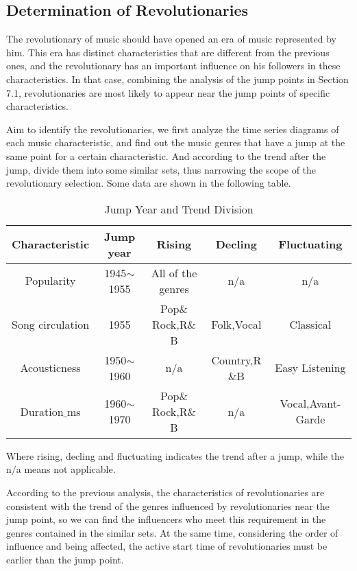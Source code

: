 \documentclass{mcmthesis}
\begin{document}
\subsection{Determination of Revolutionaries}
The revolutionary of music should have opened an era of music represented by him. This era has distinct characteristics that are different from the previous ones, and the revolutionary has an important influence on his followers in these characteristics. In that case, combining the analysis of the jump points in Section 7.1, revolutionaries are most likely to appear near the jump points of specific characteristics.

Aim to identify the revolutionaries, we first analyze the time series diagrams of each music characteristic, and find out the music genres that have a jump at the same point for a certain characteristic. And according to the trend after the jump, divide them into some similar sets, thus narrowing the scope of the revolutionary selection. Some data are shown in the following table.
\begin{table}[H]
	\centering  
	\caption{Jump Year and Trend Division}
	
	\label{table_time}
	
	\begin{tabular}{ccccc}  
		
		\toprule   
		
		Characteristic&Jump year&Rising&Decling&Fluctuating \\ 
		\midrule    
		Popularity&1945$\sim$1955&All of the genres&n$/$a&n$/$a
		\\  
		Song circulation&1955&Pop$\&$Rock,R$\&$B&Folk,Vocal&Classical
		\\ 
		Acousticness&1950$\sim$1960&n$/$a&Country,R$\&$B&Easy Listening\\
		Duration$\_$ms&1960$\sim$1970&Pop$\&$Rock,R$\&$B&n$/$a	&Vocal,Avant-Garde
		\\      
		\bottomrule  
	\end{tabular}
\end{table}
Where rising, decling and fluctuating indicates the trend after a jump, while the n$/$a means not applicable. 

According to the previous analysis, the characteristics of revolutionaries are consistent with the trend of the genres influenced by revolutionaries near the jump point, so we can find the influencers who meet this requirement in the genres contained in the similar sets. At the same time, considering the order of influence and being affected, the active start time of revolutionaries must be earlier than the jump point.
\end{document}
